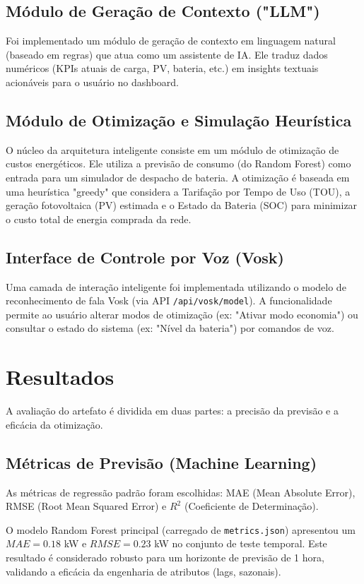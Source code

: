 \documentclass[conference]{IEEEtran}
\begin{document}
\subsection{Módulo de Geração de Contexto ("LLM")}
Foi implementado um módulo de geração de contexto em linguagem natural (baseado em regras) que atua como um assistente de IA. Ele traduz dados numéricos (KPIs atuais de carga, PV, bateria, etc.) em insights textuais acionáveis para o usuário no dashboard.

\subsection{Módulo de Otimização e Simulação Heurística}
O núcleo da arquitetura inteligente consiste em um módulo de otimização de custos energéticos. Ele utiliza a previsão de consumo (do Random Forest) como entrada para um simulador de despacho de bateria. A otimização é baseada em uma heurística "greedy" que considera a Tarifação por Tempo de Uso (TOU), a geração fotovoltaica (PV) estimada e o Estado da Bateria (SOC) para minimizar o custo total de energia comprada da rede.

\subsection{Interface de Controle por Voz (Vosk)}
Uma camada de interação inteligente foi implementada utilizando o modelo de reconhecimento de fala Vosk (via API \texttt{/api/vosk/model}). A funcionalidade permite ao usuário alterar modos de otimização (ex: "Ativar modo economia") ou consultar o estado do sistema (ex: "Nível da bateria") por comandos de voz.

\section{Resultados}

A avaliação do artefato é dividida em duas partes: a precisão da previsão e a eficácia da otimização.

\subsection{Métricas de Previsão (Machine Learning)}
As métricas de regressão padrão foram escolhidas: MAE (Mean Absolute Error), RMSE (Root Mean Squared Error) e $R^2$ (Coeficiente de Determinação). 

O modelo Random Forest principal (carregado de \texttt{metrics.json}) apresentou um $MAE = 0.18$ kW e $RMSE = 0.23$ kW no conjunto de teste temporal. Este resultado é considerado robusto para um horizonte de previsão de 1 hora, validando a eficácia da engenharia de atributos (lags, sazonais).
\end{document}
